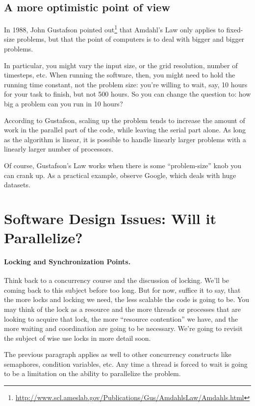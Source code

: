 \documentclass[a4paper]{report}
\begin{document}
\subsection*{A more optimistic point of view}
In 1988, John Gustafson pointed
out\footnote{\url{http://www.scl.ameslab.gov/Publications/Gus/AmdahlsLaw/Amdahls.html}}
that Amdahl's Law only applies to fixed-size problems, but that the
point of computers is to deal with bigger and bigger problems.

In particular, you might vary the input size, or the grid resolution,
number of timesteps, etc. When running the software, then, you might
need to hold the running time constant, not the problem size: you're
willing to wait, say, 10 hours for your task to finish, but not 500
hours. So you can change the question to: how big a problem can you
run in 10 hours?

According to Gustafson, scaling up the problem tends to increase the
amount of work in the parallel part of the code, while leaving the
serial part alone. As long as the algorithm is linear, it is possible
to handle linearly larger problems with a linearly larger number of
processors.

Of course, Gustafson's Law works when there is some ``problem-size''
knob you can crank up.  As a practical example, observe Google, which
deals with huge datasets.


\section*{Software Design Issues: Will it Parallelize?}


\paragraph{Locking and Synchronization Points.}
Think back to a concurrency course and the discussion of locking. We'll be coming back to this subject before too long. But for now, suffice it to say, that the more locks and locking we need, the less scalable the code is going to be. You may think of the lock as a resource and the more threads or processes that are looking to acquire that lock, the more ``resource contention'' we have, and the more waiting and coordination are going to be necessary. We're going to revisit the subject of wise use locks in more detail soon.

The previous paragraph applies as well to other concurrency constructs like semaphores, condition variables, etc. Any time a thread is forced to wait is going to be a limitation on the ability to parallelize the problem.
\end{document}
